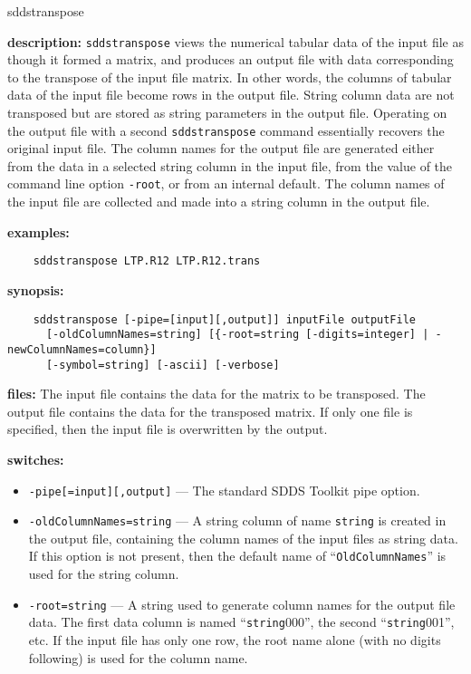 \begin{sddsprog}{sddstranspose}
  \item \textbf{description:} \verb|sddstranspose| views the numerical tabular data of the input file as though it formed a matrix, and produces an output file with data corresponding to the transpose of the input file matrix. In other words, the columns of tabular data of the input file become rows in the output file. String column data are not transposed but are stored as string parameters in the output file. Operating on the output file with a second \verb|sddstranspose| command essentially recovers the original input file. The column names for the output file are generated either from the data in a selected string column in the input file, from the value of the command line option \verb|-root|, or from an internal default. The column names of the input file are collected and made into a string column in the output file.
  \item \textbf{examples:}
    \begin{verbatim}
    sddstranspose LTP.R12 LTP.R12.trans
    \end{verbatim}
  \item \textbf{synopsis:}
    \begin{verbatim}
    sddstranspose [-pipe=[input][,output]] inputFile outputFile
      [-oldColumnNames=string] [{-root=string [-digits=integer] | -newColumnNames=column}]
      [-symbol=string] [-ascii] [-verbose]
    \end{verbatim}
  \item \textbf{files:} The input file contains the data for the matrix to be transposed. The output file contains the data for the transposed matrix. If only one file is specified, then the input file is overwritten by the output.
  \item \textbf{switches:}
    \begin{itemize}
      \item \verb|-pipe[=input][,output]| --- The standard SDDS Toolkit pipe option.
      \item \verb|-oldColumnNames=string| --- A string column of name \verb|string| is created in the output file, containing the column names of the input files as string data. If this option is not present, then the default name of ``\verb|OldColumnNames|'' is used for the string column.
      \item \verb|-root=string| --- A string used to generate column names for the output file data. The first data column is named ``\verb|string|000'', the second ``\verb|string|001'', etc. If the input file has only one row, the root name alone (with no digits following) is used for the column name.

\end{itemize}
\end{sddsprog}
